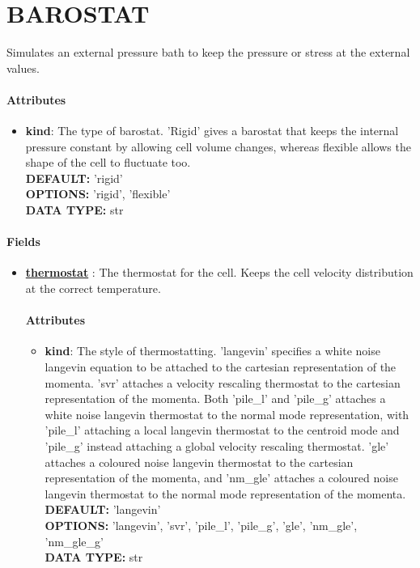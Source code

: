 \section{BAROSTAT}
\label{BAROSTAT}
Simulates an external pressure bath to keep the pressure or stress at the external values.
\paragraph{Attributes}
 \begin{itemize}
\item {\bf kind}:
 The type of barostat. 'Rigid' gives a barostat that keeps the internal pressure constant by allowing cell volume changes, whereas flexible allows the shape of the cell to fluctuate too.
{\\ \bf DEFAULT: }'rigid'
{\\ \bf OPTIONS: }'rigid', 'flexible'
{\\ \bf DATA TYPE: }str
\end{itemize}
 
\paragraph{Fields}
 \begin{itemize}
\item {\bf \hyperref[THERMOSTATS]{thermostat} }:
 The thermostat for the cell. Keeps the cell velocity distribution at the correct temperature.
\paragraph{Attributes}
 \begin{itemize}
\item {\bf kind}:
 The style of thermostatting. 'langevin' specifies a white noise langevin equation to be attached to the cartesian representation of the momenta. 'svr' attaches a velocity rescaling thermostat to the cartesian representation of the momenta. Both 'pile\_l' and 'pile\_g' attaches a white noise langevin thermostat to the normal mode representation, with 'pile\_l' attaching a local langevin thermostat to the centroid mode and 'pile\_g' instead attaching a global velocity rescaling thermostat. 'gle' attaches a coloured noise langevin thermostat to the cartesian representation of the momenta, and 'nm\_gle' attaches a coloured noise langevin thermostat to the normal mode representation of the momenta.
{\\ \bf DEFAULT: }'langevin'
{\\ \bf OPTIONS: }'langevin', 'svr', 'pile\_l', 'pile\_g', 'gle', 'nm\_gle', 'nm\_gle\_g'
{\\ \bf DATA TYPE: }str
\end{itemize}
 
\end{itemize}
 
